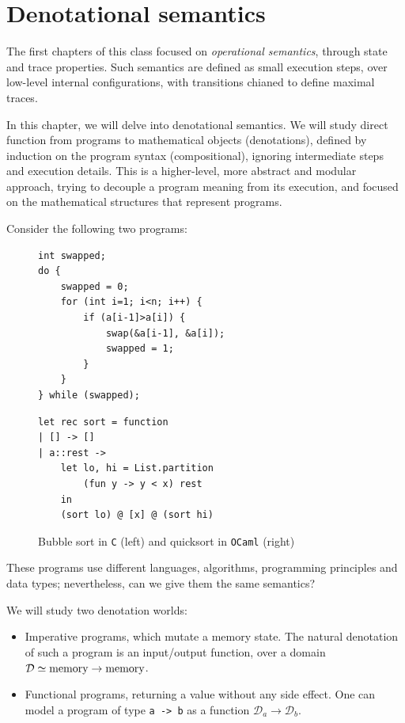 \documentclass[toc, titlepaged]{../cs-classes/cs-classes}
\begin{document}
\section{Denotational semantics}
The first chapters of this class focused on \emph{operational semantics}, through state and trace properties. Such semantics are defined as small execution steps, over low-level internal configurations, with transitions chianed to define maximal traces.

In this chapter, we will delve into denotational semantics. We will study direct function from programs to mathematical objects (denotations), defined by induction on the program syntax (compositional), ignoring intermediate steps and execution details. This is a higher-level, more abstract and modular approach, trying to decouple a program meaning from its execution, and focused on the mathematical structures that represent programs.

Consider the following two programs:
\begin{figure}[H]
    \centering
    \begin{minipage}{0.49\textwidth}
        \centering
        \begin{verbatim}
int swapped;
do {
    swapped = 0;
    for (int i=1; i<n; i++) {
        if (a[i-1]>a[i]) {
            swap(&a[i-1], &a[i]);
            swapped = 1;
        }
    }
} while (swapped);
        \end{verbatim}
    \end{minipage}
    \begin{minipage}{.49\textwidth}
        \begin{verbatim}
let rec sort = function
| [] -> []
| a::rest ->
    let lo, hi = List.partition 
        (fun y -> y < x) rest
    in
    (sort lo) @ [x] @ (sort hi)
        \end{verbatim}
    \end{minipage}
    \caption{Bubble sort in \texttt{C} (left) and quicksort in \texttt{OCaml} (right)}
\end{figure}
These programs use different languages, algorithms, programming principles and data types; nevertheless, can we give them the same semantics?

We will study two denotation worlds:
\begin{itemize}
    \item Imperative programs, which mutate a memory state. The natural denotation of such a program is an input/output function, over a domain $\mathcal{D} \simeq \textnormal{memory} \rightarrow \textnormal{memory}$.
    \item Functional programs, returning a value without any side effect. One can model a program of type \texttt{a -> b} as a function $\mathcal{D}_a \rightarrow \mathcal{D}_b$.
\end{itemize}
\end{document}
